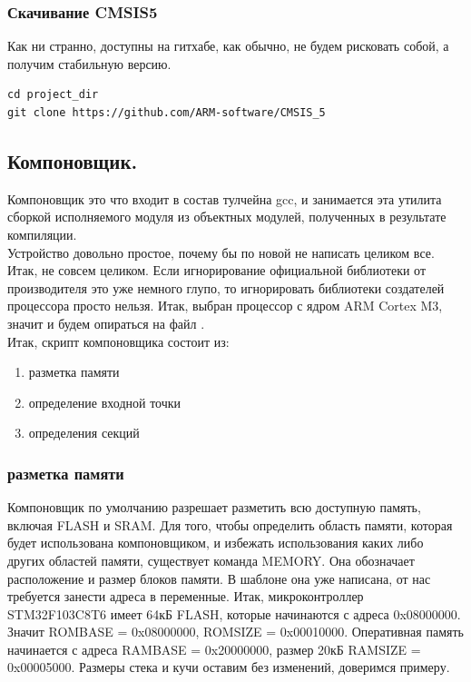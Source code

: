 \documentclass[12pt,a4paper]{article}
\begin{document}
\subsubsection{Скачивание CMSIS5}
    Как ни странно, доступны на гитхабе, как обычно, не будем рисковать
    собой, а получим стабильную версию.
\begin{lstlisting}
cd project_dir
git clone https://github.com/ARM-software/CMSIS_5
\end{lstlisting}

\subsection{Компоновщик.}
    Компоновщик это что входит в состав тулчейна gcc, и занимается эта
    утилита сборкой исполняемого модуля из объектных модулей, полученных в
    результате компиляции.\\
    Устройство довольно простое, почему бы по новой не написать целиком все.
    Итак, не совсем целиком. Если игнорирование официальной библиотеки от
    производителя это уже немного глупо, то игнорировать библиотеки создателей
    процессора просто нельзя. Итак, выбран процессор с ядром ARM Cortex M3,
    значит и будем опираться на файл
    .\\
    Итак, скрипт компоновщика состоит из:
\begin{enumerate}
    \item разметка памяти
    \item определение входной точки
    \item определения секций
\end{enumerate}
\subsubsection{разметка памяти}
    Компоновщик по умолчанию разрешает разметить всю доступную память, включая
    FLASH и SRAM. Для того, чтобы определить область памяти, которая будет
    использована компоновщиком, и избежать использования каких либо других
    областей памяти, существует команда MEMORY. Она
    обозначает расположение и размер блоков памяти. В шаблоне она уже написана,
    от нас требуется занести адреса в переменные.
    Итак, микроконтроллер STM32F103C8T6 имеет 64кБ FLASH, которые начинаются
    с адреса 0x08000000. Значит
    \textunderscore\textunderscore ROM\textunderscore BASE = 0x08000000,
    \textunderscore\textunderscore ROM\textunderscore SIZE = 0x00010000.
    Оперативная память начинается с адреса
    \textunderscore\textunderscore RAM\textunderscore BASE = 0x20000000, размер 20кБ
    \textunderscore\textunderscore RAM\textunderscore SIZE = 0x00005000.
    Размеры стека и кучи оставим без изменений,
    доверимся примеру.
\end{document}
